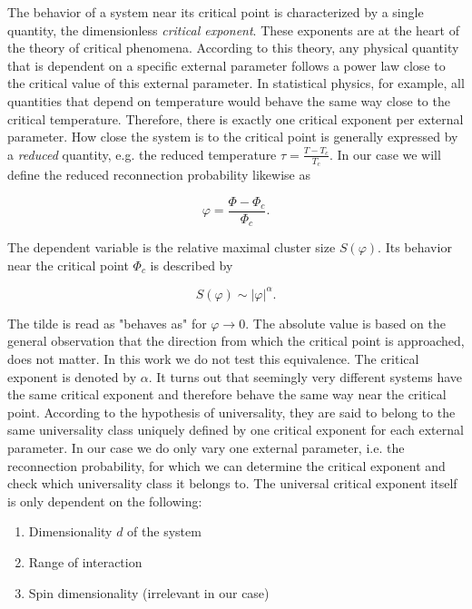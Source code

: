 \documentclass[11pt]{article}
\begin{document}
The behavior of a system near its critical point is characterized by a single quantity, the dimensionless \textit{critical exponent}. These exponents are at the heart of the theory of critical phenomena. According to this theory, any physical quantity that is dependent on a specific external parameter follows a power law close to the critical value of this external parameter. In statistical physics, for example, all quantities that depend on temperature would behave the same way close to the critical temperature. Therefore, there is exactly one critical exponent per external parameter. How close the system is to the critical point is generally expressed by a \textit{reduced} quantity, e.g. the reduced temperature $\tau = \frac{T-T_c}{T_c}$. In our case we will define the reduced reconnection probability likewise as

\begin{equation}
\varphi = \frac{\Phi - \Phi_c}{\Phi_c}.
\end{equation}

The dependent variable is the relative maximal cluster size $S(\varphi)$. Its behavior near the critical point $\Phi_c$ is described by

\begin{equation} \label{Eq:powlaw}
S(\varphi) \sim |\varphi|^\alpha.
\end{equation}

The tilde is read as "behaves as" for $\varphi \rightarrow 0$. The absolute value is based on the general observation that the direction from which the critical point is approached, does not matter. In this work we do not test this equivalence. The critical exponent is denoted by $\alpha$. It turns out that seemingly very different systems have the same critical exponent and therefore behave the same way near the critical point. According to the hypothesis of universality, they are said to belong to the same universality class uniquely defined by one critical exponent for each external parameter. In our case we do only vary one external parameter, i.e. the reconnection probability, for which we can determine the critical exponent and check which universality class it belongs to. The universal critical exponent itself is only dependent on the following:

\begin{enumerate}
\item Dimensionality $d$ of the system
\item Range of interaction
\item Spin dimensionality (irrelevant in our case)
\end{enumerate}
\end{document}
